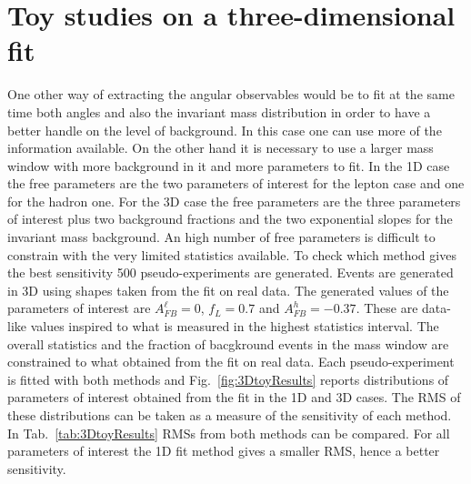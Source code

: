 
\section{Toy studies on a three-dimensional fit}

One other way of extracting the angular observables would be to fit at the same time both angles 
and also the invariant mass distribution in order to have a better handle on the level of background.
In this case one can use more of the information available. On the other hand it is necessary to use 
a larger mass window with more background in it and more parameters to fit.
In the 1D case the free parameters are the two parameters of interest for the lepton case and one
for the hadron one. For the 3D case the free parameters are the three parameters of interest 
plus two background fractions and the two exponential slopes for the invariant mass background.
An high number of free parameters is difficult to constrain with the very limited statistics available.
%
To check which method gives the best sensitivity 500 pseudo-experiments are generated.
Events are generated in 3D using shapes taken from the fit on real data.
The generated values of the parameters of interest are $A_{FB}^\ell = 0$, $f_L = 0.7$ 
and $A_{FB}^h = -0.37$. These are data-like values inspired to what is measured in the highest
statistics interval. The overall statistics and the fraction of bacgkround events in the mass
window are constrained to what obtained from the fit on real data.
Each pseudo-experiment is fitted with both methods and Fig.~\ref{fig:3DtoyResults} reports 
distributions of parameters of interest obtained from the fit in the 1D and 3D cases.
The RMS of these distributions can be taken as a measure of the sensitivity of each method.
In Tab.~\ref{tab:3DtoyResults} RMSs from both methods can be compared. For all parameters 
of interest the 1D fit method gives a smaller RMS, hence a better sensitivity.

